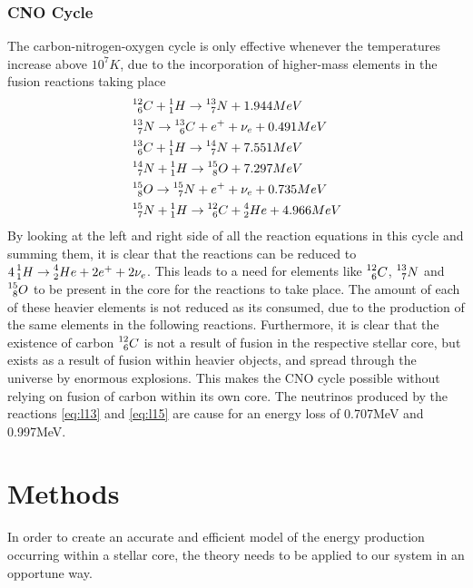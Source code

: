 \documentclass[10pt, nofootinbib, twocolumn]{revtex4-1}
\begin{document}
\subsubsection{CNO Cycle}
The carbon-nitrogen-oxygen cycle is only effective whenever the temperatures increase above $10^7K$, due to the incorporation of higher-mass elements in the fusion reactions taking place
\begin{align}
    & \prescript{12}{6}C+\prescript{1}{1}H\rightarrow\prescript{13}{7}N+1.944MeV \label{eq:lp12}\\
    & \prescript{13}{7}N \rightarrow \prescript{13}{6}C+e^++\nu_e+0.491MeV\label{eq:l13} \\
    & \prescript{13}{6}C + \prescript{1}{1}H\rightarrow \prescript{14}{7}N + 7.551MeV \label{eq:lp13}\\
    & \prescript{14}{7}N + \prescript{1}{1}H\rightarrow \prescript{15}{8}O+7.297MeV \label{eq:lp14}\\
    & \prescript{15}{8}O \rightarrow \prescript{15}{7}N +e^++\nu_e+0.735MeV\label{eq:l15} \\
    & \prescript{15}{7}N + \prescript{1}{1}H\rightarrow \prescript{12}{6}C + \prescript{4}{2}He+4.966MeV \label{eq:lp15}
\end{align}
By looking at the left and right side of all the reaction equations in this cycle and summing them, it is clear that the reactions can be reduced to $4\prescript{1}{1}H\rightarrow\prescript{4}{2}He+2e^++2\nu_e$. This leads to a need for elements like $\prescript{12}{6}C$, $\prescript{13}{7}N$ and $\prescript{15}{8}O$ to be present in the core for the reactions to take place. The amount of each of these heavier elements is not reduced as its consumed, due to the production of the same elements in the following reactions. Furthermore, it is clear that the existence of carbon $\prescript{12}{6}C$ is not a result of fusion in the respective stellar core, but exists as a result of fusion within heavier objects, and spread through the universe by enormous explosions. This makes the CNO cycle possible without relying on fusion of carbon within its own core. The neutrinos produced by the reactions \eqref{eq:l13} and \eqref{eq:l15} are cause for an energy loss of 0.707MeV and 0.997MeV. \\




\section{Methods}\label{sec:methods} 
In order to create an accurate and efficient model of the energy production occurring within a stellar core, the theory needs to be applied to our system in an opportune way.   
\end{document}
